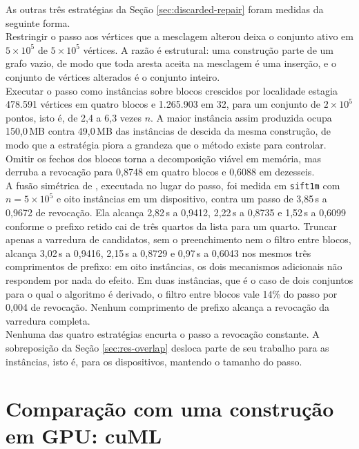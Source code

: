 As outras três estratégias da Seção \ref{sec:discarded-repair} foram medidas da seguinte forma.\\

Restringir o passo aos vértices que a mesclagem alterou deixa o conjunto ativo em $5 \times 10^5$ de $5 \times 10^5$ vértices. A razão é estrutural: uma construção parte de um grafo vazio, de modo que toda aresta aceita na mesclagem é uma inserção, e o conjunto de vértices alterados é o conjunto inteiro.\\

Executar o passo como instâncias sobre blocos crescidos por localidade estagia 478.591 vértices em quatro blocos e 1.265.903 em 32, para um conjunto de $2 \times 10^5$ pontos, isto é, de 2,4 a 6,3 vezes $n$. A maior instância assim produzida ocupa 150,0\,MB contra 49,0\,MB das instâncias de descida da mesma construção, de modo que a estratégia piora a grandeza que o método existe para controlar. Omitir os fechos dos blocos torna a decomposição viável em memória, mas derruba a revocação para 0,8748 em quatro blocos e 0,6088 em dezesseis.\\

A fusão simétrica de , executada no lugar do passo, foi medida em \texttt{sift1m} com $n = 5 \times 10^5$ e oito instâncias em um dispositivo, contra um passo de 3,85\,s a 0,9672 de revocação. Ela alcança 2,82\,s a 0,9412, 2,22\,s a 0,8735 e 1,52\,s a 0,6099 conforme o prefixo retido cai de três quartos da lista para um quarto. Truncar apenas a varredura de candidatos, sem o preenchimento nem o filtro entre blocos, alcança 3,02\,s a 0,9416, 2,15\,s a 0,8729 e 0,97\,s a 0,6043 nos mesmos três comprimentos de prefixo: em oito instâncias, os dois mecanismos adicionais não respondem por nada do efeito. Em duas instâncias, que é o caso de dois conjuntos para o qual o algoritmo é derivado, o filtro entre blocos vale 14\% do passo por 0,004 de revocação. Nenhum comprimento de prefixo alcança a revocação da varredura completa.\\

Nenhuma das quatro estratégias encurta o passo a revocação constante. A sobreposição da Seção \ref{sec:res-overlap} desloca parte de seu trabalho para as instâncias, isto é, para os dispositivos, mantendo o tamanho do passo.\\

\section{Comparação com uma construção em GPU: cuML\label{sec:res-cuml}}


